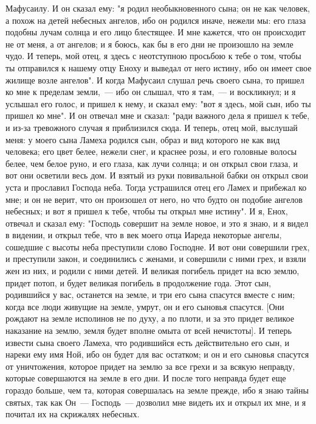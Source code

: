 Мафусаилу.
И он сказал ему: "я родил необыкновенного сына; он не как человек, а
похож на детей небесных ангелов, ибо он родился иначе, нежели мы: его глаза
подобны лучам солнца и его лицо блестящее.
И мне кажется, что он происходит не от меня, а от ангелов; и я боюсь,
как бы в его дни не произошло на земле чудо.
И теперь, мой отец, я здесь с неотступною просьбою к тебе о том, чтобы
ты отправился к нашему отцу Еноху и выведал от него истину, ибо он имеет свое
жилище возле ангелов".
И когда Мафусаил слушал речь своего сына, то пришел ко мне к пределам
земли,~--- ибо он слышал, что я там,~--- и воскликнул; и я услышал его голос, и
пришел к нему, и сказал ему: "вот я здесь, мой сын, ибо ты пришел ко мне".
И он отвечал мне и сказал: "ради важного дела я пришел к тебе, и из-за
тревожного случая я приблизился сюда.
И теперь, отец мой, выслушай меня: у моего сына Ламеха родился сын,
образ и вид которого не как вид человека; его цвет белее, нежели снег, и
краснее розы, и его головные волосы белее, чем белое руно, и его глаза, как
лучи солнца; и он открыл свои глаза, и вот они осветили весь дом.
И взятый из руки повивальной бабки он открыл свои уста и прославил
Господа неба.
Тогда устрашился отец его Ламех и прибежал ко мне; и он не верит, что
он произошел от него, но что будто он подобие ангелов небесных; и вот я пришел
к тебе, чтобы ты открыл мне истину".
И я, Енох, отвечал и сказал ему: "Господь совершит на земле новое, и
это я знаю, и я видел в видении, и открыл тебе, что в век моего отца Иареда
некоторые ангелы, сошедшие с высоты неба преступили слово Господне.
И вот они совершили грех, и преступили закон, и соединились с женами,
и совершили с ними грех, и взяли жен из них, и родили с ними детей.
И великая погибель придет на всю землю, придет потоп, и будет великая
погибель в продолжение года.
Этот сын, родившийся у вас, останется на земле, и три его сына
спасутся вместе с ним; когда все люди живущие на земле, умрут, он и его сыновья
спасутся.
[Они рождают на земле исполинов не по духу, а по плоти, и за это
придет великое наказание на землю, земля будет вполне омыта от всей нечистоты].
И теперь извести сына своего Ламеха, что родившийся есть действительно
его сын, и нареки ему имя Ной, ибо он будет для вас остатком; и он и его
сыновья спасутся от уничтожения, которое придет на землю за все грехи и за
всякую неправду, которые совершаются на земле в его дни.
И после того неправда будет еще гораздо больше, чем та, которая
совершалась на земле прежде, ибо я знаю тайны святых,
так как Он~--- Господь~--- дозволил мне видеть их и открыл их мне, и я почитал их на скрижалях небесных.
